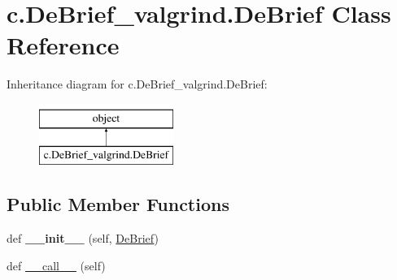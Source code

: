 \hypertarget{classc_1_1_de_brief__valgrind_1_1_de_brief}{}\section{c.\+De\+Brief\+\_\+valgrind.\+De\+Brief Class Reference}
\label{classc_1_1_de_brief__valgrind_1_1_de_brief}
Inheritance diagram for c.\+De\+Brief\+\_\+valgrind.\+De\+Brief\+:\begin{figure}[H]
\begin{center}
\leavevmode
\includegraphics[height=2.000000cm]{classc_1_1_de_brief__valgrind_1_1_de_brief}
\end{center}
\end{figure}
\subsection*{Public Member Functions}
\begin{DoxyCompactItemize}
\item 
\hypertarget{classc_1_1_de_brief__valgrind_1_1_de_brief_a09cc639182fda733d2078f758b8ffe30}{}def {\bfseries \+\_\+\+\_\+init\+\_\+\+\_\+} (self, \hyperlink{classc_1_1_de_brief__valgrind_1_1_de_brief}{De\+Brief})\label{classc_1_1_de_brief__valgrind_1_1_de_brief_a09cc639182fda733d2078f758b8ffe30}

\item 
def \hyperlink{classc_1_1_de_brief__valgrind_1_1_de_brief_aba1f8cf051c2586168c8f5ec8dc4791d}{\+\_\+\+\_\+call\+\_\+\+\_\+} (self)
\end{DoxyCompactItemize}
